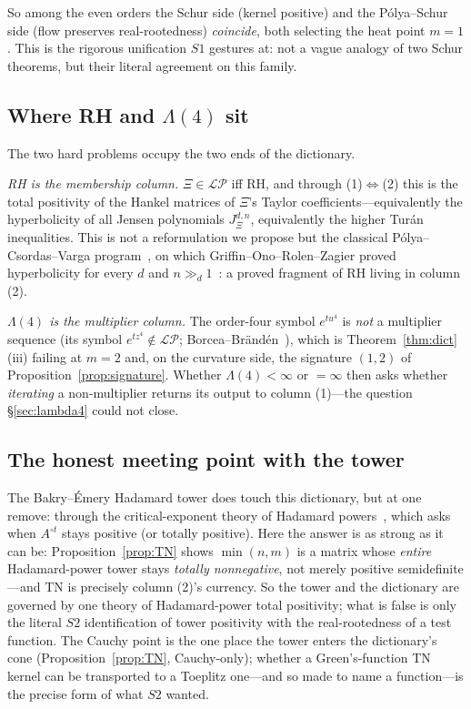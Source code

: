 \documentclass[11pt,reqno]{amsart}
\theoremstyle{plain}
\theoremstyle{definition}
\theoremstyle{remark}
\newcommand{\LP}{\mathcal{LP}}
\newcommand{\Had}{\circ}
\begin{document}
So among the even orders the Schur side (kernel positive) and the
P\'olya--Schur side (flow preserves real-rootedness) \emph{coincide},
both selecting the heat point $m=1$. This is the rigorous unification
$S1$ gestures at: not a vague analogy of two Schur theorems, but their
literal agreement on this family.

\subsection{Where RH and $\Lambda(4)$ sit}
The two hard problems occupy the two ends of the dictionary.

\emph{RH is the membership column.} $\Xi\in\LP$ iff RH, and through
(1)$\Leftrightarrow$(2) this is the total positivity of the Hankel
matrices of $\Xi$'s Taylor coefficients---equivalently the hyperbolicity
of all Jensen polynomials $J^{d,n}_\Xi$, equivalently the higher Tur\'an
inequalities. This is not a reformulation we propose but the classical
P\'olya--Csordas--Varga program~\cite{CsordasVarga2}, on which
Griffin--Ono--Rolen--Zagier proved hyperbolicity for every $d$ and
$n\gg_d 1$~\cite{GORZ}: a proved fragment of RH living in column (2).

\emph{$\Lambda(4)$ is the multiplier column.} The order-four symbol
$e^{tu^4}$ is \emph{not} a multiplier sequence (its symbol
$e^{tz^4}\notin\LP$; Borcea--Br\"and\'en~\cite{BorceaBranden2}), which is
Theorem~\ref{thm:dict}(iii) failing at $m=2$ and, on the curvature side,
the signature $(1,2)$ of Proposition~\ref{prop:signature}. Whether
$\Lambda(4)<\infty$ or $=\infty$ then asks whether \emph{iterating} a
non-multiplier returns its output to column (1)---the question
\S\ref{sec:lambda4} could not close.

\subsection{The honest meeting point with the tower}
The Bakry--\'Emery Hadamard tower does touch this dictionary, but at one
remove: through the critical-exponent theory of Hadamard
powers~\cite{BGKP}, which asks when $A^{\Had t}$ stays positive (or
totally positive). Here the answer is as strong as it can be:
Proposition~\ref{prop:TN} shows $\min(n,m)$ is a matrix whose
\emph{entire} Hadamard-power tower stays \emph{totally nonnegative}, not
merely positive semidefinite---and TN is precisely column (2)'s
currency. So the tower and the dictionary are governed by one theory of
Hadamard-power total positivity; what is false is only the literal $S2$
identification of tower positivity with the real-rootedness of a test
function. The Cauchy point is the one place the tower enters the
dictionary's cone (Proposition~\ref{prop:TN}, Cauchy-only); whether a
Green's-function TN kernel can be transported to a Toeplitz one---and so
made to name a function---is the precise form of what $S2$ wanted.
\end{document}
